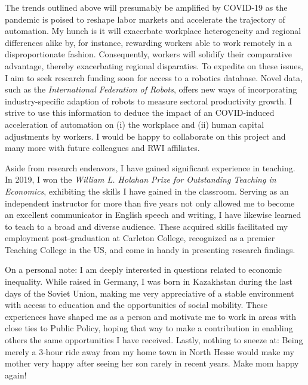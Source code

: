 \documentclass[12pt]{letter} %
\begin{document}
\begin{letter}
The trends outlined above will presumably be amplified by COVID-19 as the pandemic is poised to reshape labor markets and accelerate the trajectory of automation. My hunch is it will exacerbate workplace heterogeneity and regional differences alike by, for instance, rewarding workers able to work remotely in a disproportionate fashion. Consequently, workers will solidify their comparative advantage, thereby exacerbating regional disparaties. To expedite on these issues, I aim to seek research funding soon for access to a robotics database. Novel data, such as the \textit{International Federation of Robots}, offers new ways of incorporating industry-specific adaption of robots to measure sectoral productivity growth. I strive to use this information to deduce the impact of an COVID-induced acceleration of automation on (i) the workplace and (ii) human capital adjustments by workers. I would be happy to collaborate on this project and many more with future colleagues and RWI affiliates.


Aside from research endeavors, I have gained significant experience in teaching. In 2019, I won the \textit{William L. Holahan Prize for Outstanding Teaching in Economics}, exhibiting the skills I have gained in the classroom. Serving as an independent instructor for more than five years not only allowed me to become an excellent communicator in English speech and writing, I have likewise learned to teach to a broad and diverse audience. These acquired skills facilitated my employment post-graduation at Carleton College, recognized as a premier Teaching College in the US, and come in handy in presenting research findings. 

On a personal note: I am deeply interested in questions related to economic inequality. While raised in Germany, I was born in Kazakhstan during the last days of the Soviet Union, making me very appreciative of a stable environment with access to education and the opportunities of social mobility. These experiences have shaped me as a person and motivate me to work in areas with close ties to Public Policy, hoping that way to make a contribution in enabling others the same opportunities I have received. Lastly, nothing to sneeze at: Being merely a 3-hour ride away from my home town in North Hesse would make my mother very happy after seeing her son rarely in recent years. Make mom happy again! 


\end{letter}
\end{document}
